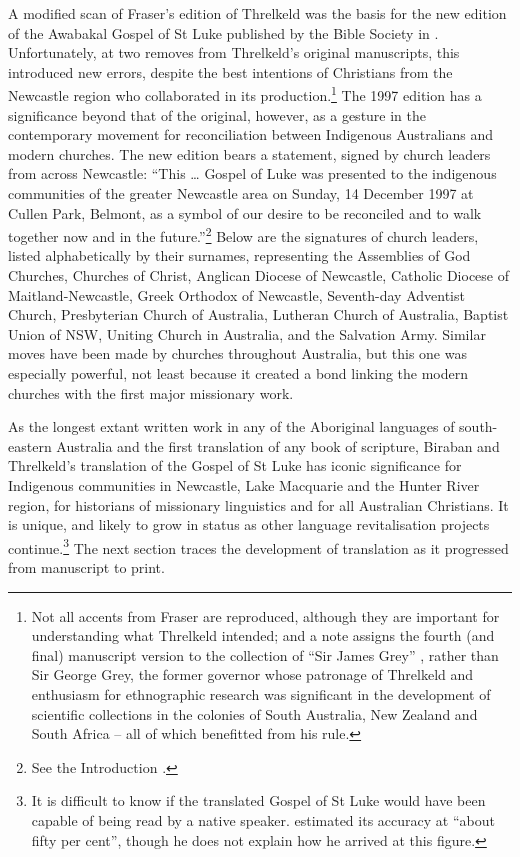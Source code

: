{A modified scan of Fraser’s edition of Threlkeld was the basis for the new edition of the Awabakal Gospel of St Luke published by the Bible Society in \citeyear{threlkeld_euangelion_1997}. Unfortunately, at two removes from Threlkeld’s original manuscripts, this introduced new errors, despite the best intentions of Christians from the Newcastle region who collaborated in its production.\footnote{Not all accents from Fraser are reproduced, although they are important for understanding what Threlkeld intended; and a note assigns the fourth (and final) manuscript version to the collection of “Sir James Grey” \citep[7]{threlkeld_euangelion_1997}, rather than Sir George Grey, the former governor whose patronage of Threlkeld and enthusiasm for ethnographic research was significant in the development of scientific collections in the colonies of South Australia, New Zealand and South Africa -- all of which benefitted from his rule.} The 1997 edition has a significance beyond that of the original, however, as a gesture in the contemporary movement for reconciliation between Indigenous Australians and modern churches. The new edition bears a statement, signed by church leaders from across Newcastle: “This … Gospel of Luke was presented to the indigenous communities of the greater Newcastle area on Sunday, 14 December 1997 at Cullen Park, Belmont, as a symbol of our desire to be reconciled and to walk together now and in the future.”\footnote{See the Introduction \citep[3]{threlkeld_euangelion_1997}.} Below are the signatures of church leaders, listed alphabetically by their surnames, representing the Assemblies of God Churches, Churches of Christ, Anglican Diocese of Newcastle, Catholic Diocese of Maitland-Newcastle, Greek Orthodox of Newcastle, Seventh-day Adventist Church, Presbyterian Church of Australia, Lutheran Church of Australia, Baptist Union of NSW, Uniting Church in Australia, and the Salvation Army. Similar moves have been made by churches throughout Australia, but this one was especially powerful, not least because it created a bond linking the modern churches with the first major missionary work.

As the longest extant written work in any of the Aboriginal languages of south-eastern Australia and the first translation of any book of scripture, Biraban and Threlkeld’s translation of the Gospel of St Luke has iconic significance for Indigenous communities in Newcastle, Lake Macquarie and the Hunter River region, for historians of missionary linguistics and for all Australian Christians. It is unique, and likely to grow in status as other language revitalisation projects continue.\footnote{It is difficult to know if the translated Gospel of St Luke would have been capable of being read by a native speaker. \citet[2]{gunson_australian_1974a} estimated its accuracy at “about fifty per cent”, though he does not explain how he arrived at this figure.} The next section traces the development of translation as it progressed from manuscript to print.

}
